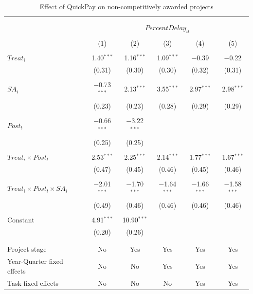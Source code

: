 \documentclass[
]{article}
\begin{document}
\begin{table}[H] \centering 
  \caption{Effect of QuickPay on non-competitively awarded projects} 
  \label{} 
\small 
\begin{tabular}{@{\extracolsep{-2pt}}lccccc} 
\\[-1.8ex]\hline 
\hline \\[-1.8ex] 
\\[-1.8ex] & \multicolumn{5}{c}{$PercentDelay_{it}$  } \\ 
\\[-1.8ex] & (1) & (2) & (3) & (4) & (5)\\ 
\hline \\[-1.8ex] 
 $Treat_i$ & 1.40$^{***}$ & 1.16$^{***}$ & 1.09$^{***}$ & $-$0.39 & $-$0.22 \\ 
  & (0.31) & (0.30) & (0.30) & (0.32) & (0.31) \\ 
  & & & & & \\ 
 $SA_i$ & $-$0.73$^{***}$ & 2.13$^{***}$ & 3.55$^{***}$ & 2.97$^{***}$ & 2.98$^{***}$ \\ 
  & (0.23) & (0.23) & (0.28) & (0.29) & (0.29) \\ 
  & & & & & \\ 
 $Post_t$ & $-$0.66$^{***}$ & $-$3.22$^{***}$ &  &  &  \\ 
  & (0.25) & (0.25) &  &  &  \\ 
  & & & & & \\ 
 $Treat_i \times Post_t$ & 2.53$^{***}$ & 2.25$^{***}$ & 2.14$^{***}$ & 1.77$^{***}$ & 1.67$^{***}$ \\ 
  & (0.47) & (0.45) & (0.46) & (0.45) & (0.46) \\ 
  & & & & & \\ 
 $Treat_i \times Post_t \times SA_i $ & $-$2.01$^{***}$ & $-$1.70$^{***}$ & $-$1.64$^{***}$ & $-$1.66$^{***}$ & $-$1.58$^{***}$ \\ 
  & (0.49) & (0.46) & (0.46) & (0.46) & (0.46) \\ 
  & & & & & \\ 
 Constant & 4.91$^{***}$ & 10.90$^{***}$ &  &  &  \\ 
  & (0.20) & (0.26) &  &  &  \\ 
  & & & & & \\ 
\hline \\[-1.8ex] 
Project stage & No & Yes & Yes & Yes & Yes \\ 
Year-Quarter fixed effects & No & No & Yes & Yes & Yes \\ 
Task fixed effects & No & No & No & Yes & Yes \\ 

\end{tabular}
\end{table}
\end{document}

